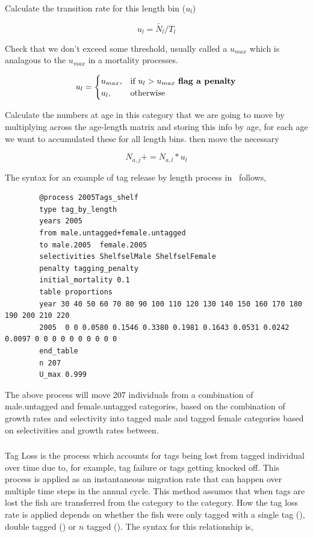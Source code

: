 Calculate the transition rate for this length bin ($u_l$)

$$u_{l} = \tilde{N_l} / T_l$$



Check that we don't exceed some threshold, usually called a $u_{max}$ which is analagous to the $u_{max}$ in a mortality processes.

\[
u_{l} = 
\begin{cases}
u_{max},& \text{if } u_{l} > u_{max} \text{ \textbf{flag a penalty}}\\
u_{l},  & \text{otherwise}
\end{cases}
\]

Calculate the numbers at age in this category that we are going to move by multiplying across the age-length matrix and storing this info by age, for each age we want to accumulated these for all length bins. then move the necessary 

$$N_{a,j} += N_{a,l} * u_l$$

The syntax for an example of tag release by length process in \CNAME\ follows, 
{\small{\begin{verbatim}
		@process 2005Tags_shelf
		type tag_by_length 
		years 2005
		from male.untagged+female.untagged
		to male.2005  female.2005	
		selectivities ShelfselMale ShelfselFemale
		penalty tagging_penalty
		initial_mortality 0.1
		table proportions
		year 30 40 50 60 70 80 90 100 110 120 130 140 150 160 170 180 190 200 210 220
		2005  0 0 0.0580 0.1546 0.3380 0.1981 0.1643 0.0531 0.0242 0.0097 0 0 0 0 0 0 0 0 0 0
		end_table
		n 207
		U_max 0.999
		\end{verbatim}}}

The above process will move 207 individuals from a combination of male.untagged and female.untagged categories, based on the combination of growth rates and selectivity into tagged male and tagged female categories based on selectivities and growth rates between.

\subsubsection{}

Tag Loss is the process which accounts for tags being lost from tagged individual over time due to, for example, tag failure or tags getting knocked off. This process is applied as an instantaneous migration rate that can happen over multiple time steps in the annual cycle. This method assumes that when tags are lost the fish are transferred from the  category to the  category. How the tag loss rate is applied depends on whether the fish were only tagged with a single tag (), double tagged () or $n$ tagged (). The syntax for this relationship is,

